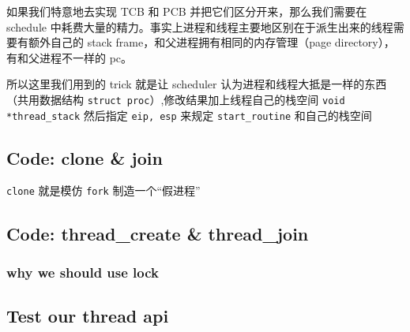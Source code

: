 如果我们特意地去实现 TCB 和 PCB 并把它们区分开来，那么我们需要在 schedule 中耗费大量的精力。事实上进程和线程主要地区别在于派生出来的线程需要有额外自己的 stack frame，和父进程拥有相同的内存管理（page directory），有和父进程不一样的 pc。

所以这里我们用到的 trick 就是让 scheduler 认为进程和线程大抵是一样的东西（共用数据结构 \texttt{struct proc}）,修改结果加上线程自己的栈空间 \texttt{void *thread\_stack} 然后指定 \texttt{eip, esp} 来规定 \texttt{start\_routine} 和自己的栈空间

\subsection{Code: clone \& join}

\texttt{clone} 就是模仿 \texttt{fork} 制造一个“假进程”




\subsection{Code: thread\_create \& thread\_join}

\subsubsection{why we should use lock}

\subsection{Test our thread api}